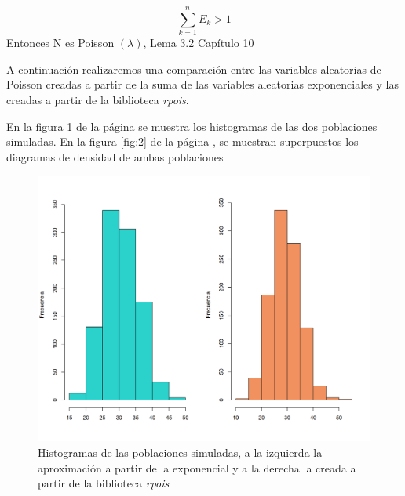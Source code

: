 \documentclass{article}
\begin{document}
\begin{equation}
    \sum_{k=1}^{n}E_{k}>1 
\end{equation}
Entonces N es Poisson $(\lambda)$, Lema 3.2 Capítulo 10 \cite{expvar}  

A continuación realizaremos una comparación entre las variables aleatorias de Poisson creadas a partir de la suma de las variables aleatorias exponenciales y las creadas a partir de la biblioteca \textit{rpois}.

En la figura \ref{fig:1} de la página \pageref{fig:1} se muestra los histogramas de las dos poblaciones simuladas. En la figura \ref{fig:2} de la página \pageref{fig:2}, se muestran superpuestos los diagramas de densidad de ambas poblaciones 

\begin{center}
\begin{figure}
\includegraphics[scale=0.65]{figuras/AproxEx30.png}
\caption{Histogramas de las poblaciones simuladas, a la izquierda la aproximación a partir de la exponencial y a la derecha la creada a partir de la biblioteca \textit{rpois}}
\label{fig:1}
\end{figure}
\end{center}
\end{document}
